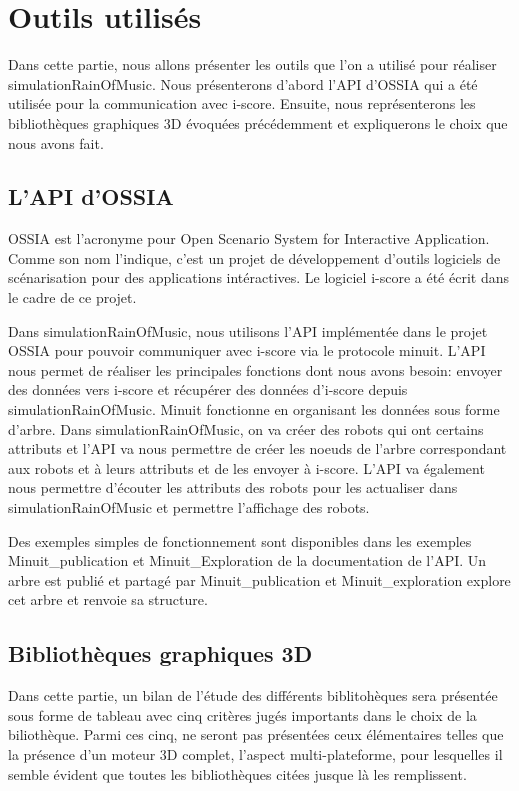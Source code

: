 \section{Outils utilisés}

Dans cette partie, nous allons présenter les outils que l'on a utilisé pour réaliser simulationRainOfMusic. Nous présenterons d'abord l'API d'OSSIA qui a été utilisée pour la communication avec i-score. Ensuite, nous représenterons les bibliothèques graphiques 3D évoquées précédemment et expliquerons le choix que nous avons fait.

\subsection{L'API d'OSSIA}

OSSIA est l'acronyme pour Open Scenario System for Interactive Application. Comme son nom l'indique, c'est un projet de développement d'outils logiciels de scénarisation pour des applications intéractives. Le logiciel i-score a été écrit dans le cadre de ce projet. 

Dans simulationRainOfMusic, nous utilisons l'API implémentée dans le projet OSSIA pour pouvoir communiquer avec i-score via le protocole minuit. L'API nous permet de réaliser les principales fonctions dont nous avons besoin: envoyer des données vers i-score et récupérer des données d'i-score depuis simulationRainOfMusic.  Minuit fonctionne en organisant les données sous forme d'arbre. Dans simulationRainOfMusic, on va créer des robots qui ont certains attributs et l'API va nous permettre de créer les noeuds de l'arbre correspondant aux robots et à leurs attributs et de les envoyer à i-score. L'API va également nous permettre d'écouter les attributs des robots pour les actualiser dans simulationRainOfMusic et permettre l'affichage des robots. 

Des exemples simples de fonctionnement sont disponibles dans les exemples Minuit\_publication et Minuit\_Exploration de la documentation de l'API. Un arbre est publié et partagé par Minuit\_publication et Minuit\_exploration explore cet arbre et renvoie sa structure.

\subsection{Bibliothèques graphiques 3D}

Dans cette partie, un bilan de l'étude des différents biblitohèques sera présentée sous forme de tableau avec cinq critères jugés importants dans le choix de la biliothèque. Parmi ces cinq, ne seront pas présentées ceux élémentaires telles que la présence d'un moteur 3D complet, l'aspect multi-plateforme, pour lesquelles il semble évident que toutes les bibliothèques citées jusque là les remplissent.

